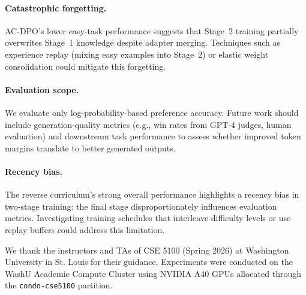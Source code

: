 \documentclass{article}
\begin{document}
\paragraph{Catastrophic forgetting.}
AC-DPO's lower easy-task performance suggests that Stage~2 training partially overwrites Stage~1 knowledge despite adapter merging. Techniques such as experience replay (mixing easy examples into Stage~2) or elastic weight consolidation could mitigate this forgetting.

\paragraph{Evaluation scope.}
We evaluate only log-probability-based preference accuracy. Future work should include generation-quality metrics (e.g., win rates from GPT-4 judges, human evaluation) and downstream task performance to assess whether improved token margins translate to better generated outputs.

\paragraph{Recency bias.}
The reverse curriculum's strong overall performance highlights a recency bias in two-stage training: the final stage disproportionately influences evaluation metrics. Investigating training schedules that interleave difficulty levels or use replay buffers could address this limitation.

\begin{ack}
We thank the instructors and TAs of CSE 5100 (Spring 2026) at Washington University in St. Louis for their guidance. Experiments were conducted on the WashU Academic Compute Cluster using NVIDIA A40 GPUs allocated through the \texttt{condo-cse5100} partition.
\end{ack}


\end{document}
